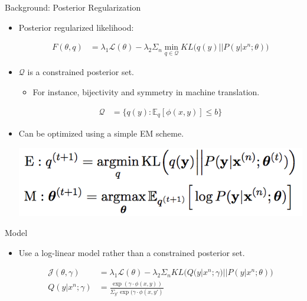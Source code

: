 \documentclass{beamer}
\begin{document}
\begin{frame}{Background: Posterior Regularization}{}
\begin{itemize}
\item Posterior regularized likelihood:

\begin{align*}
F(\theta, q) &= \lambda_1 \mathcal{L}(\theta) - \lambda_2 \Sigma_n  \min_{q \in \mathcal{Q}} KL \big( q(y) || P(y|x^n; \theta) \big)
\end{align*}

\item $\mathcal{Q}$ is a constrained posterior set.
\begin{itemize}
\item For instance, bijectivity and symmetry in machine translation.
\end{itemize}

\begin{align*}
\mathcal{Q} &= \{ q(y) : \mathbb{E}_q[\phi(x, y)] \leq b\}
\end{align*}

\item Can be optimized using a simple EM scheme.

\vspace{4mm}
\centering
\includegraphics[width=0.75\textheight]{em}

\end{itemize}

\end{frame}

\begin{frame}{Model}{}
\begin{itemize}
\item Use a log-linear model rather than a constrained posterior set.

\begin{align*}
\mathcal{J}(\theta, \gamma) &= \lambda_1 \mathcal{L}(\theta) - \lambda_2 \Sigma_n KL \big( Q(y|x^n; \gamma) || P(y|x^n; \theta) \big) \\
Q(y|x^n; \gamma) &= \frac{\exp(\gamma \cdot \phi(x,y))}{\Sigma_{y'} \exp(\gamma \cdot \phi(x,y')}
\end{align*}


\end{itemize}

\end{frame}
\end{document}
